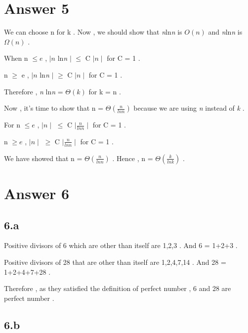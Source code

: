 \documentclass[12pt]{article}
\begin{document}
\section*{Answer 5}

\hspace{13px} We can choose n for k . Now , we should show that \textit{n}ln\textit{n} is $O(n)$ and \textit{n}ln\textit{n} is $\Omega(n)$ . \par 
When n $\leq{e} $ , $\mid \textit{n}$ ln\textit{n} $\mid$ $\leq$ C $\mid n \mid $ for C = 1 .\par 
\hspace{30px} n $\geq$ e , $\mid \textit{n}$ ln\textit{n} $\mid$ $\geq$ C $\mid n \mid $ for C = 1 . \par
Therefore , \textit{n} ln\textit{n} = $\Theta(k)$ for k = n .  \par \bigskip
Now , it's time to show that n = $\Theta(\frac{n}{ln\textit{n}})$ because we are using \textit{n} instead of \textit{k} . \par 
For n $\leq{e} $ , $\mid \textit{n}\mid$ $\leq$ C $\mid \frac{n}{ln\textit{n}} \mid $ for C = 1 .\par 
\hspace{17px} n $\geq{e} $ , $\mid \textit{n}\mid$ $\geq$ C $\mid \frac{n}{ln\textit{n}} \mid $ for C = 1 .\par 
We have showed that n = $\Theta(\frac{n}{ln\textit{n}})$ . Hence , n = $\Theta(\frac{k}{ln\textit{k}})$ .


 
\section*{Answer 6}

\subsection*{6.a}

\hspace{15px} Positive divisors of 6 which are other than itself are 1,2,3 . And 6 = 1+2+3 . \par \bigskip
Positive divisors of 28 that are other than itself are 1,2,4,7,14 . And 28 = 1+2+4+7+28 . \par \bigskip
Therefore , as they satisfied the definition of perfect number , 6 and 28 are perfect number . \bigskip

\subsection*{6.b}
\end{document}
